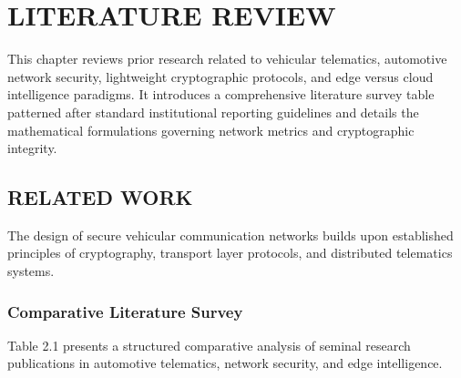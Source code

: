 \documentclass[12pt,a4paper]{report}
\begin{document}
\chapter{LITERATURE REVIEW}

This chapter reviews prior research related to vehicular telematics, automotive network security, lightweight cryptographic protocols, and edge versus cloud intelligence paradigms. It introduces a comprehensive literature survey table patterned after standard institutional reporting guidelines and details the mathematical formulations governing network metrics and cryptographic integrity.

\section{RELATED WORK}
The design of secure vehicular communication networks builds upon established principles of cryptography, transport layer protocols, and distributed telematics systems.

\subsection{Comparative Literature Survey}
Table 2.1 presents a structured comparative analysis of seminal research publications in automotive telematics, network security, and edge intelligence.
\end{document}
